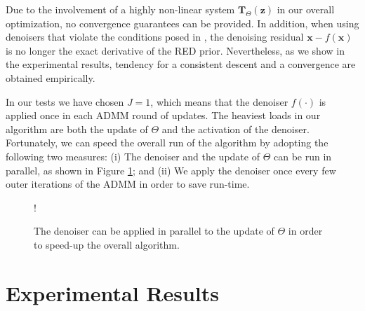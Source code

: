 \documentclass[12pt]{article}
\def\x{{\mathbf x}}
\def\u{ \mathbf{u}}
\def\z{{\mathbf z}}
\def\u{{\mathbf u}}
\def\T{{\mathbf T}}
\begin{document}
Due to the involvement of a highly non-linear system $\T_{\Theta}(\z)$ in our overall optimization, no convergence guarantees can be provided. In addition, when using denoisers that violate the conditions posed in \cite{RED-2017}, the denoising residual $\x-f(\x)$ is no longer the exact derivative of the RED prior. Nevertheless, as we show in the experimental results, tendency for a consistent descent and a convergence are obtained empirically.  

In our tests we have chosen $J=1$, which means that the denoiser $f(\cdot)$ is applied once in each ADMM round of updates. The heaviest loads in our algorithm are both the update of $\Theta$ and the activation of the denoiser. Fortunately, we can speed the overall run of the algorithm by adopting the following two measures: (i) The denoiser and the update of $\Theta$ can be run in parallel, as shown in Figure \ref{figure:parallel}; and (ii) We apply the denoiser once every few outer iterations of the ADMM in order to save run-time.  



\begin{figure}[!htb]
\centering
\resizebox {.8\linewidth} {!} {
    }
\caption{The denoiser can be applied in parallel to the update of $\Theta$ in order to speed-up the overall algorithm.}
\label{fig:datafusionindirectdirectfc}
\label{figure:parallel}
\end{figure}







\section{Experimental Results}
\label{sec:experiments}
\end{document}
